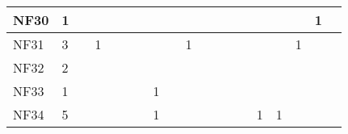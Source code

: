 \begin{table}[]
{\begin{tabular}{|l|l|l|l|l|l|l|l|l|l|l|l|l|l|l|l|l|l|l|}
NF30 & 1                                                     &                                                  &    &    &    &    &                                                  &    &    &    &    &                                                   &    &                                                   &    &                                                             & 1                                                           &                                                             \\ \hline
NF31 & 3                                                     &                                                  & 1  &    &    &    &                                                  &    & 1  &    &    &                                                   &    &                                                   &    & 1                                                           &                                                             &                                                             \\ \hline
NF32 & 2                                                     &                                                  &    &    &    &    &                                                  &    &    &    &    &                                                   &    &                                                   &    &                                                             &                                                             &                                                             \\ \hline
NF33 & 1                                                     &                                                  &    &    &    &    & 1                                                &    &    &    &    &                                                   &    &                                                   &    &                                                             &                                                             &                                                             \\ \hline
NF34 & 5                                                     &                                                  &    &    &    &    & 1                                                &    &    &    &    &                                                   &    & 1                                                 & 1  &                                                             &                                                             &                                                             \\ \hline

\end{tabular}}
\end{table}
